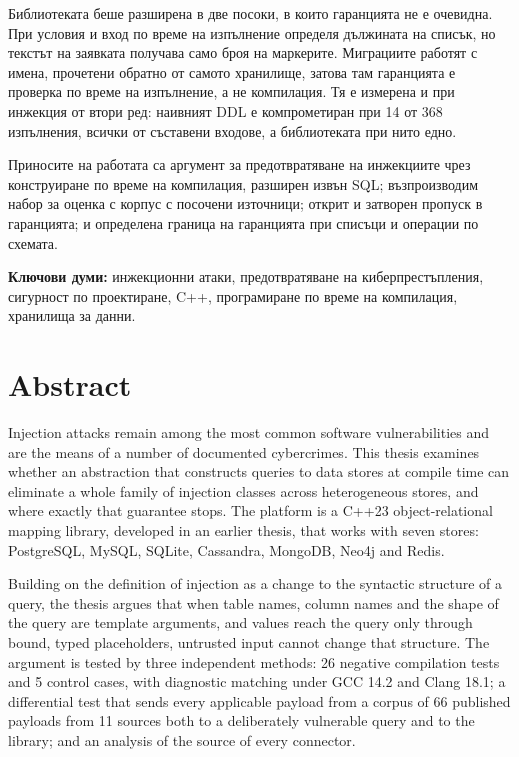 Библиотеката беше разширена в две посоки, в които гаранцията не е очевидна. При
условия  и  вход по време на изпълнение определя дължината
на списък, но текстът на заявката получава само броя на маркерите. Миграциите
работят с имена, прочетени обратно от самото хранилище, затова там гаранцията е
проверка по време на изпълнение, а не компилация. Тя е измерена и при инжекция от
втори ред: наивният DDL е компрометиран при 14 от 368 изпълнения,
всички от съставени входове, а библиотеката при нито едно.

Приносите на работата са аргумент за предотвратяване на инжекциите чрез
конструиране по време на компилация, разширен извън SQL; възпроизводим набор за
оценка с корпус с посочени източници; открит и затворен пропуск в гаранцията; и
определена граница на гаранцията при списъци и операции по схемата.

\bigskip
\noindent\textbf{Ключови думи:} инжекционни атаки, предотвратяване на
киберпрестъпления, сигурност по проектиране, C++, програмиране по време на
компилация, хранилища за данни.

\section*{Abstract}

Injection attacks remain among the most common software vulnerabilities and are
the means of a number of documented cybercrimes. This thesis examines whether an
abstraction that constructs queries to data stores at compile time can eliminate
a whole family of injection classes across heterogeneous stores, and where
exactly that guarantee stops. The platform is a C++23 object-relational mapping
library, developed in an earlier thesis, that works with seven stores:
PostgreSQL, MySQL, SQLite, Cassandra, MongoDB, Neo4j and Redis.

Building on the definition of injection as a change to the syntactic structure
of a query, the thesis argues that when table names, column names and the shape
of the query are template arguments, and values reach the query only through
bound, typed placeholders, untrusted input cannot change that structure. The
argument is tested by three independent methods: 26 negative compilation tests
and 5 control cases, with diagnostic matching under GCC 14.2 and Clang 18.1; a
differential test that sends every applicable payload from a corpus of 66
published payloads from 11 sources both to a deliberately vulnerable query and to
the library; and an analysis of the source of every connector.

